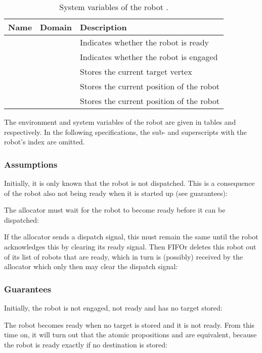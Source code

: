 \begin{table}
\centering
\begin{tabular}{c|c|l}
\hline
Name & Domain & Description \\
\hline
 &  & Indicates whether the robot is ready \\
 &  & Indicates whether the robot is engaged \\
 &  & Stores the current target vertex \\
 &  & Stores the current position of the robot \\
 &  & Stores the current position of the robot \\
\hline
\end{tabular}
\caption{System variables of the robot .}
\label{tab:sys:robot}
\end{table}

The environment and system variables of the robot  are given in tables  and  respectively. In the following specifications, the sub- and superscripts with the robot's index  are omitted.

\subsubsection{Assumptions}

Initially, it is only known that the robot is not dispatched. This is a consequence of the robot also not being ready when it is started up (see guarantees):


The allocator must wait for the robot to become ready before it can be dispatched:


If the allocator sends a dispatch signal, this must remain the same until the robot acknowledges this by clearing its ready signal. Then FIFOr deletes this robot out of its list of robots that are ready, which in turn is (possibly) received by the allocator which only then may clear the dispatch signal:



\subsubsection{Guarantees}

Initially, the robot is not engaged, not ready and has no target stored:


The robot becomes ready when no target is stored and it is not ready. From this time on, it will turn out that the atomic propositions  and  are equivalent, because the robot is ready exactly if no destination is stored:


